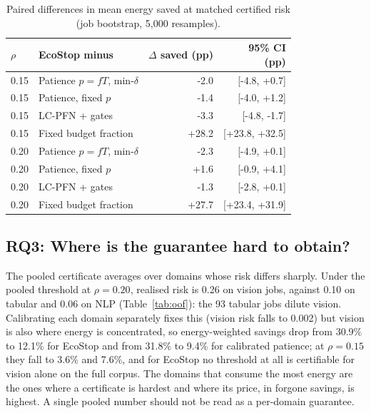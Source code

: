 \documentclass[3p,twocolumn,10pt]{elsarticle}
\theoremstyle{definition}
\begin{document}
\begin{table}[t]
\centering
\caption{Paired differences in mean energy saved at matched certified risk (job bootstrap, 5{,}000 resamples).}
\label{tab:paired}
\footnotesize
\begin{adjustbox}{max width=\columnwidth}
\begin{tabular}{lp{3.1cm}rr}
\toprule
$\rho$ & EcoStop minus & \shortstack{$\Delta$ saved\\(pp)} & \shortstack{95\% CI\\(pp)} \\
\midrule
0.15 & Patience $p{=}fT$, min-$\delta$ & -2.0 & [-4.8, +0.7] \\
0.15 & Patience, fixed $p$ & -1.4 & [-4.0, +1.2] \\
0.15 & LC-PFN + gates & -3.3 & [-4.8, -1.7] \\
0.15 & Fixed budget fraction & +28.2 & [+23.8, +32.5] \\
0.20 & Patience $p{=}fT$, min-$\delta$ & -2.3 & [-4.9, +0.1] \\
0.20 & Patience, fixed $p$ & +1.6 & [-0.9, +4.1] \\
0.20 & LC-PFN + gates & -1.3 & [-2.8, +0.1] \\
0.20 & Fixed budget fraction & +27.7 & [+23.4, +31.9] \\
\bottomrule
\end{tabular}
\end{adjustbox}
\end{table}

\subsection{RQ3: Where is the guarantee hard to obtain?}
\label{sec:rq3}
The pooled certificate averages over domains whose risk differs sharply. Under the pooled threshold at $\rho=0.20$, realised risk is 0.26 on vision jobs, against 0.10 on tabular and 0.06 on NLP (Table~\ref{tab:oof}): the 93 tabular jobs dilute vision. Calibrating each domain separately fixes this (vision risk falls to 0.002) but vision is also where energy is concentrated, so energy-weighted savings drop from 30.9\% to 12.1\% for EcoStop and from 31.8\% to 9.4\% for calibrated patience; at $\rho=0.15$ they fall to 3.6\% and 7.6\%, and for EcoStop no threshold at all is certifiable for vision alone on the full corpus. The domains that consume the most energy are the ones where a certificate is hardest and where its price, in forgone savings, is highest. A single pooled number should not be read as a per-domain guarantee.
\end{document}
